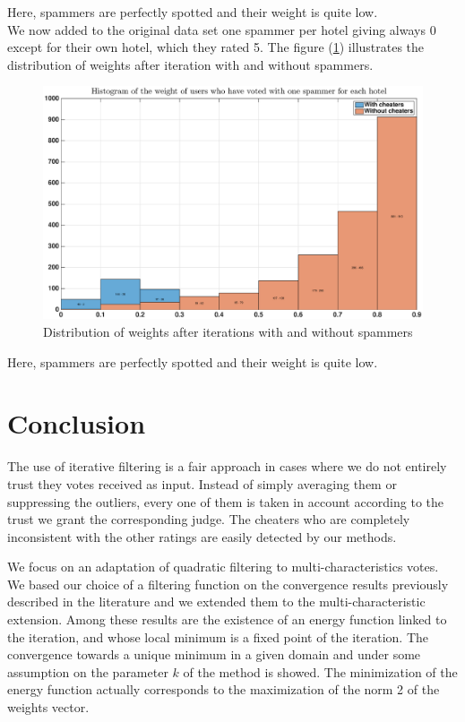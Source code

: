 \documentclass[12pt,a4paper]{article}
\begin{document}
Here, spammers are perfectly spotted and their weight is quite low.\\

We now added to the original data set one spammer per hotel giving always 0 except for their own hotel, which they rated 5. The figure (\ref{fig:hotel:not_random_each_hotel}) illustrates the distribution of weights after iteration with and without spammers.

\begin{figure}[!h]
\centering
\includegraphics[width = \textwidth]{hotels/not_random_each_hotels.eps}
\caption{\label{fig:hotel:not_random_each_hotel} Distribution of weights after iterations with and without spammers}
\end{figure}

Here, spammers are perfectly spotted and their weight is quite low.

\FloatBarrier
\section{Conclusion}
The use of iterative filtering is a fair approach in cases where we do not entirely trust they votes received as input. Instead of simply averaging them or suppressing the outliers, every one of them is taken in account according to the trust we grant the corresponding judge. The cheaters who are completely inconsistent with the other ratings are easily detected by our methods.

We focus on an adaptation of quadratic filtering to multi-characteristics votes. We based our choice of a filtering function on the convergence results previously described in the literature and we extended them to the multi-characteristic extension. Among these results are the existence of an energy function linked to the iteration, and whose local minimum is a fixed point of the iteration. The convergence towards a unique minimum in a given domain and under some assumption on the parameter $k$ of the method is showed.
The minimization of the energy function actually corresponds to the maximization of the norm 2 of the weights vector.
\end{document}
